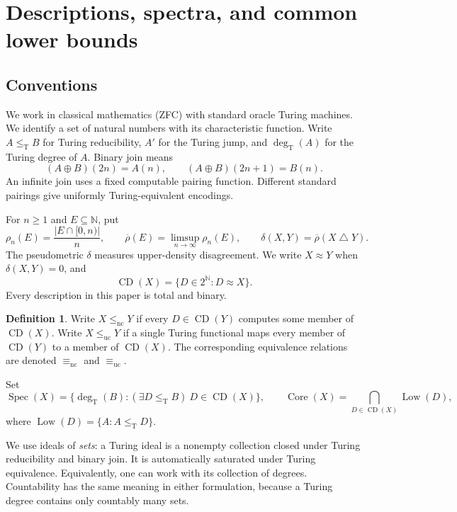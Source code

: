 \documentclass[11pt,letterpaper]{article}
\theoremstyle{plain}
\theoremstyle{definition}
\newtheorem{definition}[theorem]{Definition}
\theoremstyle{remark}
\numberwithin{equation}{section}
\newcommand{\N}{\mathbb N}
\newcommand{\Cantor}{2^{\N}}
\newcommand{\leT}{\leq_{\mathrm T}}
\newcommand{\leuc}{\leq_{\mathrm{uc}}}
\newcommand{\lenc}{\leq_{\mathrm{nc}}}
\newcommand{\equc}{\equiv_{\mathrm{uc}}}
\newcommand{\eqnc}{\equiv_{\mathrm{nc}}}
\newcommand{\Core}{\operatorname{Core}}
\newcommand{\CD}{\operatorname{CD}}
\newcommand{\Low}{\operatorname{Low}}
\newcommand{\Spec}{\operatorname{Spec}}
\newcommand{\degT}{\deg_{\mathrm T}}
\newcommand{\sd}{\mathbin{\triangle}}
\newcommand{\Dens}{\overline\rho}
\begin{document}
\section{Descriptions, spectra, and common lower bounds}\label{cr12:sec:basic}
\subsection{Conventions}
We work in classical mathematics (ZFC) with standard oracle Turing machines.
We identify a set of natural numbers with its characteristic function. Write
$A\leT B$ for Turing reducibility, $A'$ for the Turing jump, and
$\degT(A)$ for the Turing degree of $A$. Binary join means
\[
 (A\oplus B)(2n)=A(n),\qquad (A\oplus B)(2n+1)=B(n).
\]
An infinite join uses a fixed computable pairing function. Different standard
pairings give uniformly Turing-equivalent encodings.

For $n\ge1$ and $E\subseteq\N$, put
\[
 \rho_n(E)=\frac{|E\cap[0,n)|}{n},\qquad
 \Dens(E)=\limsup_{n\to\infty}\rho_n(E),\qquad
 \delta(X,Y)=\Dens(X\sd Y).
\]
The pseudometric $\delta$ measures upper-density disagreement. We write
$X\approx Y$ when $\delta(X,Y)=0$, and
\[
 \CD(X)=\{D\in\Cantor:D\approx X\}.
\]
Every description in this paper is total and binary.

\begin{definition}
Write $X\lenc Y$ if every $D\in\CD(Y)$ computes some member of $\CD(X)$.
Write $X\leuc Y$ if a single Turing functional maps every member of $\CD(Y)$
to a member of $\CD(X)$. The corresponding equivalence relations are denoted
$\eqnc$ and $\equc$.

Set
\[
 \Spec(X)=\{\degT(B):(\exists D\leT B)\ D\in\CD(X)\},
 \qquad
 \Core(X)=\bigcap_{D\in\CD(X)}\Low(D),
\]
where $\Low(D)=\{A:A\leT D\}$.
\end{definition}

We use ideals of \emph{sets}: a Turing ideal is a nonempty collection closed
under Turing reducibility and binary join. It is automatically saturated under
Turing equivalence. Equivalently, one can work with its collection of degrees.
Countability has the same meaning in either formulation, because a Turing degree
contains only countably many sets.
\end{document}
